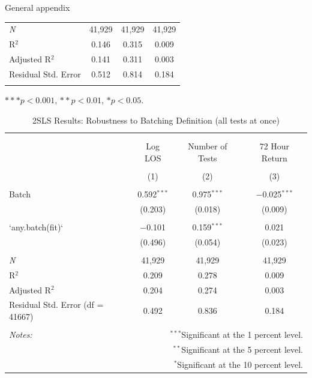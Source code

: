 \documentclass[,,nonblindrev]{informs}
\begin{document}
\begin{APPENDIX}{General appendix}
\begin{table}[!htbp]
\begin{tabular}{@{\extracolsep{10pt}}lccc}
\textit{N} & 41,929 & 41,929 & 41,929 \\ 
R$^{2}$ & 0.146 & 0.315 & 0.009 \\ 
Adjusted R$^{2}$ & 0.141 & 0.311 & 0.003 \\ 
Residual Std. Error & 0.512 & 0.814 & 0.184 \\ 
\hline 
\hline \\[-1.8ex] 
\end{tabular}
\begin{tablenotes}
\tiny
\item $*** p < 0.001$, $** p < 0.01$, $* p < 0.05$.
\end{tablenotes}
\end{table}

\newpage

\begin{table}[!htbp] \centering 
  \caption{2SLS Results: Robustness to Batching Definition (all tests at once)} 
  \label{tab:robustness_batching2} 
  
\begin{tabular}{@{\extracolsep{5pt}}lccc} 
\\[-1.8ex]\hline 
\hline \\[-1.8ex] 
\\[-1.8ex] & Log LOS & Number of Tests & 72 Hour Return \\ 
\\[-1.8ex] & (1) & (2) & (3)\\ 
\hline \\[-1.8ex] 
 Batch & 0.592$^{***}$ & 0.975$^{***}$ & $-$0.025$^{***}$ \\ 
  & (0.203) & (0.018) & (0.009) \\ 
  & & & \\ 
 `any.batch(fit)` & $-$0.101 & 0.159$^{***}$ & 0.021 \\ 
  & (0.496) & (0.054) & (0.023) \\ 
  & & & \\ 
\textit{N} & 41,929 & 41,929 & 41,929 \\ 
R$^{2}$ & 0.209 & 0.278 & 0.009 \\ 
Adjusted R$^{2}$ & 0.204 & 0.274 & 0.003 \\ 
Residual Std. Error (df = 41667) & 0.492 & 0.836 & 0.184 \\ 
\hline 
\hline \\[-1.8ex] 
\textit{Notes:} & \multicolumn{3}{r}{$^{***}$Significant at the 1 percent level.} \\ 
 & \multicolumn{3}{r}{$^{**}$Significant at the 5 percent level.} \\ 
 & \multicolumn{3}{r}{$^{*}$Significant at the 10 percent level.} \\ 
\end{tabular} 
\end{table}

\newpage

\end{APPENDIX}
\end{document}
